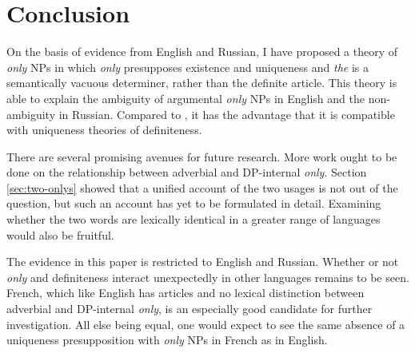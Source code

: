 \section{Conclusion \label{sec:conclusion}}
On the basis of evidence from English and Russian, I have proposed a theory of \textit{only} NPs in which \textit{only} presupposes existence and uniqueness and \textit{the} is a semantically vacuous determiner, rather than the definite article. This theory is able to explain the ambiguity of argumental \textit{only} NPs in English and the non-ambiguity in Russian. Compared to \citet{cb2015}, it has the advantage that it is compatible with uniqueness theories of definiteness.

There are several promising avenues for future research. More work ought to be done on the relationship between adverbial and DP-internal \textit{only}. Section \ref{sec:two-onlys} showed that a unified account of the two usages is not out of the question, but such an account has yet to be formulated in detail. Examining whether the two words are lexically identical in a greater range of languages would also be fruitful.

The evidence in this paper is restricted to English and Russian. Whether or not \textit{only} and definiteness interact unexpectedly in other languages remains to be seen. French, which like English has articles and no lexical distinction between adverbial and DP-internal \textit{only}, is an especially good candidate for further investigation. All else being equal, one would expect to see the same absence of a uniqueness presupposition with \textit{only} NPs in French as in English.
